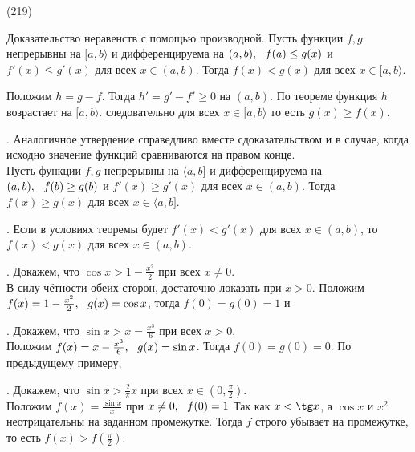 (219)

\T \q Доказательство неравенств с помощью производной. Пусть функции $f, g$ непрерывны на $[a, b\rangle$ и дифференцируема на $(a, b),\ \  f(a) \le g(x)$ и $f'(x) \le g'(x)$ для всех $x \in (a, b)$. Тогда $f(x) < g(x)$ для всех $x \in [a, b\rangle$.

\D Положим $h = g - f$. Тогда $h' = g' - f' \ge 0$ на $(a, b)$. По теореме функция $h$ возрастает на $[a, b\rangle$. следовательно для всех $x \in [a, b\rangle$  то есть $g(x) \ge f(x)$.

. Аналогичное утвердение справедливо вместе сдоказательством и в случае, когда исходно значение функций сравниваются на правом конце.\\
Пусть функции $f, g$ непрерывны на $\langle a, b]$  и дифференцируема на $(a, b),\ \  f(b) \ge g(b)$ и $f'(x) \ge g'(x)$ для всех $x \in  (a, b)$. Тогда $f(x) \ge g(x)$ для всех $x \in \langle a, b]$.

. Если в условиях теоремы будет $f'(x) < g'(x)$ для всех $x \in (a, b)$, то $f(x) < g(x)$ для всех $x \in (a, b)$.

. Докажем, что $\cos x > 1 - \frac{x^2}2$ при всех $x\neq 0$.\\
В силу чётности обеих сторон, достаточно локазать при $x > 0$. Положим $f(x) = 1 - \frac{x^2}2,\ \  g(x) = \cos x$, тогда $f(0) = g(0) = 1$ и 

. Докажем, что $\sin x > x = \frac{x^3}6$ при всех $x > 0$.\\
Положим $f(x) = x - \frac{x^3}6,\ \  g(x) = \sin x$. Тогда $f(0) = g(0) = 0$. По предыдущему примеру, 

. Докажем, что $\sin x > \frac 2\pi x$ при всех $x \in (0, \frac\pi2)$.\\
Положим $f(x) = \frac{\sin x}{x}$ при $x \neq 0,\ \  f(0) = 1$  Так как $x < \tg x$, а $\cos x$ и $x^2$ неотрицательны на заданном промежутке. Тогда $f$ строго убывает на промежутке, то есть $f(x) > f(\frac\pi2)$.